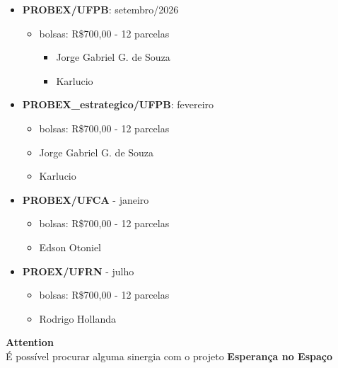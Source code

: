 \begin{framed}
\begin{itemize}
\begin{itemize}
\begin{itemize}
\item Allyson Macário de Araújo Caldas
\end{itemize}
\end{itemize}


\item \textbf{PROBEX/UFPB}: setembro/2026

\begin{itemize}
\item bolsas: R\$700,00 - 12 parcelas

\begin{itemize}
\item Jorge Gabriel G. de Souza
\item Karlucio
\end{itemize}
\end{itemize}


\item \textbf{PROBEX\_estrategico/UFPB}: fevereiro

\begin{itemize}
\item bolsas: R\$700,00 - 12 parcelas
\item Jorge Gabriel G. de Souza
\item Karlucio
\end{itemize}


\item \textbf{PROBEX/UFCA} - janeiro

\begin{itemize}
\item bolsas: R\$700,00 - 12 parcelas
\item Edson Otoniel
\end{itemize}


\item \textbf{PROEX/UFRN} - julho

\begin{itemize}
\item bolsas: R\$700,00 - 12 parcelas
\item Rodrigo Hollanda
\end{itemize}
\end{itemize}
\end{framed}

\begin{framed}
\textbf{Attention}\\
É possível procurar alguma sinergia com o projeto \textbf{Esperança no Espaço}
\end{framed}

